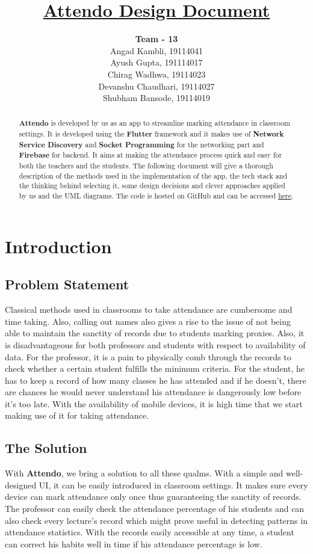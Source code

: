\documentclass{article}
\title{\textbf{\underline{Attendo Design Document}}}
\author{
\textbf{Team - 13}\\
Angad Kambli, 19114041\\ 
Ayush Gupta, 191114017 \\ 
Chirag Wadhwa, 19114023 \\ 
Devanshu Chaudhari, 19114027 \\ 
Shubham Bansode, 19114019 }
\date{}
\begin{document}
\maketitle

\begin{abstract}
    \textbf{Attendo} is developed by us as an app to streamline marking attendance in classroom settings. It is developed using the \textbf{Flutter} framework and it makes use of \textbf{Network Service Discovery} and \textbf{Socket Programming} for the networking part and \textbf{Firebase} for backend. It aims at making the attendance process quick and easy for both the teachers and the students. The following document will give a thorough description of the methods used in the implementation of the app, the tech stack and the thinking behind selecting it, some design decisions and clever approaches applied by us and the UML diagrams. The code is hosted on GitHub and can be accessed \href{https://github.com/Attendo-App/Attendo}{here}.
\end{abstract}
\tableofcontents
\newpage

\section{Introduction}
\subsection{Problem Statement}
Classical methods used in classrooms to take attendance are cumbersome and time taking. Also, calling out names also gives a rise to the issue of not being able to maintain the sanctity of records due to students marking proxies. Also, it is disadvantageous for both professors and students with respect to availability of data. For the professor, it is a pain to physically comb through the records to check whether a certain student fulfills the minimum criteria. For the student, he has to keep a record of how many classes he has attended and if he doesn't, there are chances he would never understand his attendance is dangerously low before it's too late. With the availability of mobile devices, it is high time that we start making use of it for taking attendance.
\subsection{The Solution}
With \textbf{Attendo}, we bring a solution to all these qualms. With a simple and well-designed UI, it can be easily introduced in classroom settings. It makes sure every device can mark attendance only once thus guaranteeing the sanctity of records. The professor can easily check the attendance percentage of his students and can also check every lecture's record which might prove useful in detecting patterns in attendance statistics. With the records easily accessible at any time, a student can correct his habits well in time if his attendance percentage is low.
\end{document}
